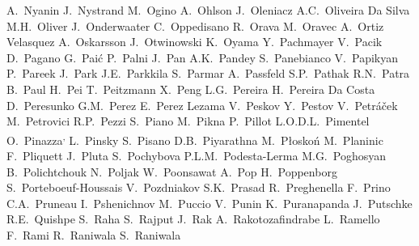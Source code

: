 \begin{flushleft}
A.~Nyanin\And 
J.~Nystrand\And 
M.~Ogino\And 
A.~Ohlson\And 
J.~Oleniacz\And 
A.C.~Oliveira Da Silva\And 
M.H.~Oliver\And 
J.~Onderwaater\And 
C.~Oppedisano\And 
R.~Orava\And 
M.~Oravec\And 
A.~Ortiz Velasquez\And 
A.~Oskarsson\And 
J.~Otwinowski\And 
K.~Oyama\And 
Y.~Pachmayer\And 
V.~Pacik\And 
D.~Pagano\And 
G.~Pai\'{c}\And 
P.~Palni\And 
J.~Pan\And 
A.K.~Pandey\And 
S.~Panebianco\And 
V.~Papikyan\And 
P.~Pareek\And 
J.~Park\And 
J.E.~Parkkila\And 
S.~Parmar\And 
A.~Passfeld\And 
S.P.~Pathak\And 
R.N.~Patra\And 
B.~Paul\And 
H.~Pei\And 
T.~Peitzmann\And 
X.~Peng\And 
L.G.~Pereira\And 
H.~Pereira Da Costa\And 
D.~Peresunko\And 
G.M.~Perez\And 
E.~Perez Lezama\And 
V.~Peskov\And 
Y.~Pestov\And 
V.~Petr\'{a}\v{c}ek\And 
M.~Petrovici\And 
R.P.~Pezzi\And 
S.~Piano\And 
M.~Pikna\And 
P.~Pillot\And 
L.O.D.L.~Pimentel\And 
O.~Pinazza\textsuperscript{,}\And 
L.~Pinsky\And 
S.~Pisano\And 
D.B.~Piyarathna\And 
M.~P\l osko\'{n}\And 
M.~Planinic\And 
F.~Pliquett\And 
J.~Pluta\And 
S.~Pochybova\And 
P.L.M.~Podesta-Lerma\And 
M.G.~Poghosyan\And 
B.~Polichtchouk\And 
N.~Poljak\And 
W.~Poonsawat\And 
A.~Pop\And 
H.~Poppenborg\And 
S.~Porteboeuf-Houssais\And 
V.~Pozdniakov\And 
S.K.~Prasad\And 
R.~Preghenella\And 
F.~Prino\And 
C.A.~Pruneau\And 
I.~Pshenichnov\And 
M.~Puccio\And 
V.~Punin\And 
K.~Puranapanda\And 
J.~Putschke\And 
R.E.~Quishpe\And 
S.~Raha\And 
S.~Rajput\And 
J.~Rak\And 
A.~Rakotozafindrabe\And 
L.~Ramello\And 
F.~Rami\And 
R.~Raniwala\And 
S.~Raniwala\And 

\end{flushleft}
